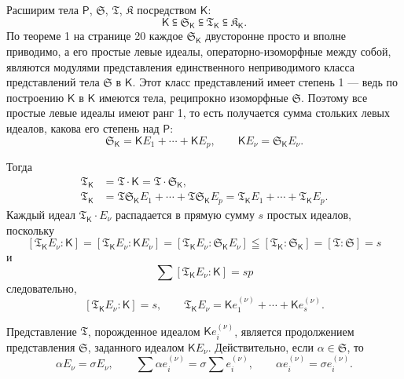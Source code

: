 \documentclass[11pt]{article}
\begin{document}
Расширим тела \(\mathsf P\), \(\mathfrak S\), \(\mathfrak T\), \(\mathfrak K\) посредством \(\mathsf{K}\):
\[
\mathsf{K}\subseteqq \mathfrak S_{\mathsf{K}}\subseteqq \mathfrak T_{\mathsf{K}}\subseteqq \mathfrak K_{\mathsf{K}}.
\]
По теореме 1 на странице 20 каждое \(\mathfrak S_{\mathsf{K}}\) двусторонне просто и вполне приводимо, а его простые левые идеалы, операторно-изоморфные между собой, являются модулями представления единственного неприводимого класса представлений тела \(\mathfrak S\) в \(\mathsf{K}\). Этот класс представлений имеет степень 1 --- ведь по построению \(\mathsf{K}\) в \(\mathsf{K}\) имеются тела, реципрокно изоморфные \(\mathfrak S\). Поэтому все простые левые идеалы имеют ранг 1, то есть получается сумма стольких левых идеалов, какова его степень над \(\mathsf P\):
\[
\mathfrak S_{\mathsf{K}}=\mathsf K E_1+\cdots+\mathsf K E_p,\qquad \mathsf K E_\nu=\mathfrak S_{\mathsf{K}} E_\nu.
\]

Тогда
\[
\begin{aligned}
\mathfrak T_{\mathsf{K}}&=\mathfrak T\cdot \mathsf{K}=\mathfrak T\cdot \mathfrak S_{\mathsf{K}},\\
\mathfrak T_{\mathsf{K}}&=\mathfrak T\mathfrak S_{\mathsf{K}} E_1+\cdots+\mathfrak T\mathfrak S_{\mathsf{K}} E_p
              =\mathfrak T_{\mathsf{K}} E_1+\cdots+\mathfrak T_{\mathsf{K}} E_p.
\end{aligned}
\]
Каждый идеал \(\mathfrak T_{\mathsf{K}}\cdot E_\nu\) распадается в прямую сумму \(s\) простых идеалов, поскольку
\[
[\mathfrak T_{\mathsf{K}} E_\nu:\mathsf{K}]=[\mathfrak T_{\mathsf{K}} E_\nu:\mathsf K E_\nu]=[\mathfrak T_{\mathsf{K}} E_\nu:\mathfrak S_{\mathsf{K}} E_\nu]\leqq[\mathfrak T_{\mathsf{K}}:\mathfrak S_{\mathsf{K}}]=[\mathfrak T:\mathfrak S]=s
\]
и
\[
\sum [\mathfrak T_{\mathsf{K}} E_\nu:\mathsf{K}]=sp
\]
следовательно,
\[
[\mathfrak T_{\mathsf{K}} E_\nu:\mathsf{K}]=s,
\qquad
\mathfrak T_{\mathsf{K}} E_\nu=\mathsf K e_1^{(\nu)}+\cdots+\mathsf K e_s^{(\nu)}.
\]

Представление \(\mathfrak T\), порожденное идеалом \(\mathsf K e_i^{(\nu)}\), является продолжением представления \(\mathfrak S\), заданного идеалом \(\mathsf K E_\nu\). Действительно, если \(\alpha\in \mathfrak S\), то
\[
\alpha E_\nu=\sigma E_\nu,\qquad
\sum \alpha e_i^{(\nu)}=\sigma\sum e_i^{(\nu)},\qquad
\alpha e_i^{(\nu)}=\sigma e_i^{(\nu)}.
\]
\end{document}
